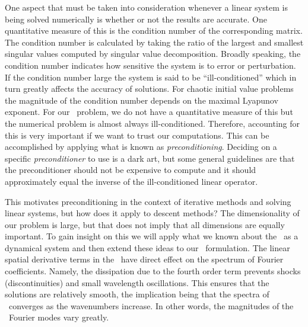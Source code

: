 
One aspect that must be taken into consideration whenever
a linear system is being solved numerically is whether or
not the results are accurate. One quantitative measure
of this is the condition number of the corresponding matrix.
The condition number is calculated by taking the ratio
of the largest and smallest singular values computed
by singular value decomposition. Broadly speaking,
the condition number indicates how sensitive
the system is to error or perturbation. If the condition number
large the system is said to be ``ill-conditioned'' which in
turn greatly affects the accuracy of solutions. For chaotic
initial value problems the magnitude of the condition
number depends on the maximal Lyapunov exponent.
For our \spt\ problem, we do not have a quantitative measure
of this but the numerical problem is almost always ill-conditioned.
Therefore, accounting for this is very important if we want
to trust our computations. This can be accomplished by applying
what is known as \emph{preconditioning}. Deciding on a specific
\emph{preconditioner} to use is a dark art, but some general
guidelines are that the preconditioner should not be expensive
to compute and it should approximately equal the inverse of the
ill-conditioned linear operator.

This motivates preconditioning in the context of iterative methods
and solving linear systems, but how does it apply to descent methods?
The dimensionality of our problem is large, but that does not imply
that all dimensions are equally important. To gain insight on this
we will apply what we known about the \KSe\ as a dynamical system
and then extend these ideas to our \spt\ formulation. The linear
spatial derivative terms in the \KSe\ have direct effect on the spectrum
of Fourier coefficients. Namely, the dissipation due to the fourth
order term prevents shocks (discontinuities)
and small wavelength oscillations. This ensures that the solutions
are relatively smooth, the implication being that the spectra
of \Fcs\ converges as the wavenumbers increase. In other words,
the magnitudes of the \spt\ Fourier modes vary greatly.

